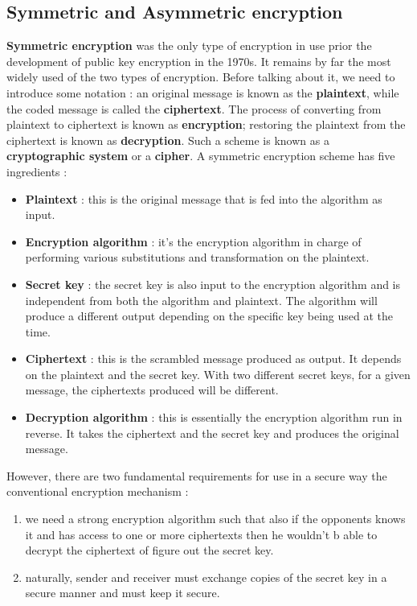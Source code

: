 \documentclass[11pt]{article}
\begin{document}
\subsection{Symmetric and Asymmetric encryption}
\textbf{Symmetric encryption} was the only type of encryption in use prior the development of public key encryption in the 1970s. It remains by far the most widely used of the two types of encryption. Before talking about it, we need to introduce some notation : an original message is known as the \textbf{plaintext}, while the coded message is called the \textbf{ciphertext}. The process of converting from plaintext to ciphertext is known as \textbf{encryption}; restoring the plaintext from the ciphertext is known as \textbf{decryption}. Such a scheme is known as a \textbf{cryptographic system} or a \textbf{cipher}. A symmetric encryption scheme has five ingredients :
\begin{itemize}
\item \textbf{Plaintext} : this is the original message that is fed into the algorithm as input.
\item \textbf{Encryption algorithm} : it's the encryption algorithm in charge of performing various substitutions and transformation on the plaintext.
\item \textbf{Secret key} : the secret key is also input to the encryption algorithm and is independent from both the algorithm and plaintext. The algorithm will produce a different output depending on the specific key being used at the time.
\item \textbf{Ciphertext} : this is the scrambled message produced as output. It depends on the plaintext and the secret key. With two different secret keys, for a given message, the ciphertexts produced will be different.
\item \textbf{Decryption algorithm} : this is essentially the encryption algorithm run in reverse. It takes the ciphertext and the secret key and produces the original message.
\end{itemize}
However, there are two fundamental requirements for use in a secure way the conventional encryption mechanism :
\begin{enumerate}
\item we need a strong encryption algorithm such that also if the opponents knows it and has access to one or more ciphertexts then he wouldn't b able to decrypt the ciphertext of figure out the secret key.
\item naturally, sender and receiver must exchange copies of the secret key in a secure manner and must keep it secure. 
\end{enumerate}
\end{document}
